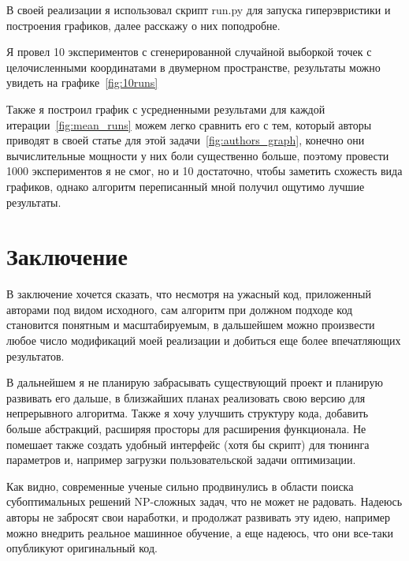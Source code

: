 \documentclass[a4paper,12pt]{extarticle}
\begin{document}
В своей реализации я использовал скрипт run.py для запуска гиперэвристики и построения графиков, далее расскажу о них поподробне. 

Я провел 10 экспериментов с сгенерированной случайной выборкой точек с целочисленными координатами в двумерном пространстве, результаты можно увидеть на графике~\ref{fig:10runs}

Также я построил график с усредненными результами для каждой итерации~\ref{fig:mean_runs} можем легко сравнить его с тем, который авторы приводят в своей статье для этой задачи~\ref{fig:authors_graph}, конечно они вычислительные мощности у них боли существенно больше, поэтому провести 1000 экспериментов я не смог, но и 10 достаточно, чтобы заметить схожесть вида графиков, однако алгоритм переписанный мной получил ощутимо лучшие результаты.

\section{Заключение}

В заключение хочется сказать, что несмотря на ужасный код, приложенный авторами под видом исходного, сам алгоритм при должном подходе код становится понятным и масштабируемым, в дальшейшем можно произвести любое число модификаций моей реализации и добиться еще более впечатляющих результатов.

В дальнейшем я не планирую забрасывать существующий проект и планирую развивать его дальше, в близжайших планах реализовать свою версию для непрерывного алгоритма. Также я хочу улучшить структуру кода, добавить больше абстракций, расширяя просторы для расширения функционала. Не помешает также создать удобный интерфейс (хотя бы скрипт) для тюнинга параметров и, например загрузки пользовательской задачи оптимизации.

Как видно, современные ученые сильно продвинулись в области поиска субоптимальных решений NP-сложных задач, что не может не радовать. Надеюсь авторы не забросят свои наработки, и продолжат развивать эту идею, например можно внедрить реальное машинное обучение, а еще надеюсь, что они все-таки опубликуют оригинальный код.
\end{document}
